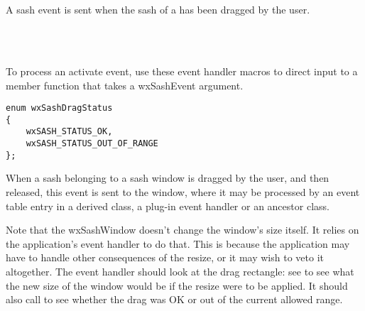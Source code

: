 \section{}\label{wxsashevent}

A sash event is sent when the sash of a  has been
dragged by the user.


\\
\\


To process an activate event, use these event handler macros to direct input to a member
function that takes a wxSashEvent argument.

\twocolwidtha{7cm}%
\begin{twocollist}\itemsep=0pt
\end{twocollist}


{\small
\begin{verbatim}
enum wxSashDragStatus
{
    wxSASH_STATUS_OK,
    wxSASH_STATUS_OUT_OF_RANGE
};
\end{verbatim}
}


When a sash belonging to a sash window is dragged by the user, and then released,
this event is sent to the window, where it may be processed by an event table
entry in a derived class, a plug-in event handler or an ancestor class.

Note that the wxSashWindow doesn't change the window's size itself. It relies on the application's
event handler to do that. This is because the application may have to handle other consequences
of the resize, or it may wish to veto it altogether. The event handler should
look at the drag rectangle: see  to see
what the new size of the window would be if the resize were to be applied. It should
also call  to see whether the
drag was OK or out of the current allowed range.

